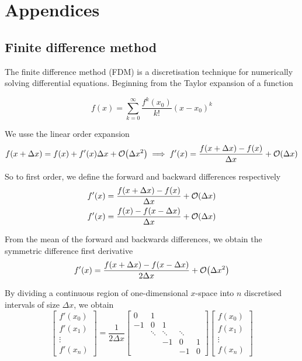 \documentclass[11pt]{article}
\begin{document}
\section{Appendices}

\subsection{Finite difference method}

The finite difference method (FDM) is a discretisation technique for numerically solving differential equations. Beginning from the Taylor expansion of a function 

\begin{equation}
f(x) = \sum_{k=0}^\infty \frac{f^k(x_0)}{k!} (x-x_0)^k
\end{equation}

We usse the linear order expansion
\begin{equation}
f(x + \Delta x) = f(x) + f'(x) \Delta x + \order{\Delta x^2}
\implies f'(x) = \frac{f(x + \Delta x) - f(x)}{\Delta x} + \order{\Delta x}
\end{equation}

So to first order, we define the forward and backward differences respectively
\begin{align}
f'(x) = \frac{f(x + \Delta x) - f(x)}{\Delta x} + \order{\Delta x} \\
f'(x) = \frac{f(x) - f(x - \Delta x)}{\Delta x} + \order{\Delta x}
\end{align}

From the mean of the forward and backwards differences, we obtain the symmetric difference first derivative
\begin{equation}
f'(x) = \frac{f(x + \Delta x) - f(x - \Delta x)}{2 \Delta x} + \order{\Delta x^2}
\end{equation}

By dividing a continuous region of one-dimensional $x$-space into $n$ discretised intervals of size $\Delta x$, we obtain 
\begin{equation}
\begin{bmatrix}
	f'(x_0) \\ f'(x_1) \\ \vdots \\ f'(x_n)
\end{bmatrix}
=
\frac{1}{2 \Delta x}
\begin{bmatrix}
	0 & 1 \\
	-1 & 0 & 1 \\
	& \ddots & \ddots & \ddots \\
	& & -1 & 0 & 1 \\
	& & & -1 & 0
\end{bmatrix}
\begin{bmatrix}
	f(x_0) \\ f(x_1) \\ \vdots \\ f(x_n)
\end{bmatrix}
\end{equation}
\end{document}
